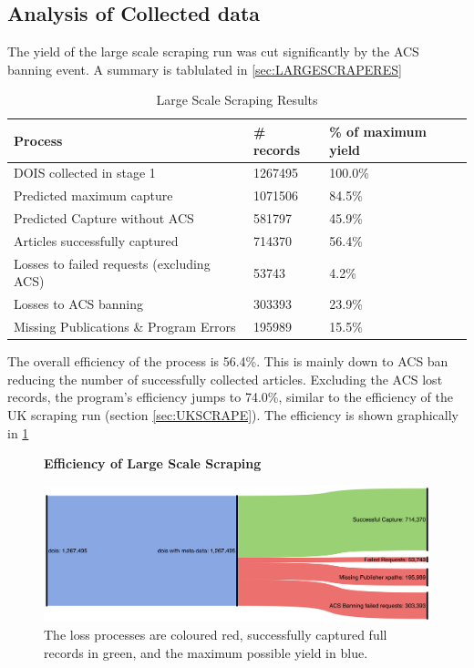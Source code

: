\subsection{Analysis of Collected data}
The yield of the large scale scraping run was cut significantly by the ACS banning event. A summary is tablulated in \ref{sec:LARGESCRAPERES}
\begin{table}[h!]
\label{tab:LARGESCRAPERES}
\caption{Large Scale Scraping Results}
\begin{center}
\begin{tabular}{||l|l|l||}
\hline
Process & \# records & \% of maximum yield\\
\hline
DOIS collected in stage 1 &  1267495 &100.0\%\\
\hline
Predicted maximum capture & 1071506 &  84.5\%\\
Predicted Capture without ACS & 581797 & 45.9\%\\
\hline
Articles successfully captured & 714370 & 56.4\%\\
Losses to failed requests (excluding ACS)& 53743 & 4.2\%\\
Losses to ACS banning & 303393 & 23.9\%\\
Missing Publications \& Program Errors & 195989 & 15.5\%\\
\hline
\end{tabular}
\end{center}
\end{table}
The overall efficiency of the process is 56.4\%. This is mainly down to ACS ban reducing the number of successfully collected articles. Excluding the ACS lost records, the program's efficiency jumps to 74.0\%, similar to the efficiency of the UK scraping run (section \ref{sec:UKSCRAPE}).  The efficiency is shown graphically in \ref{fig:LARGESANK}
\begin{figure}[H]
    \centering
    \textbf{Efficiency of Large Scale Scraping}\par\medskip
    \includegraphics[scale=0.07]{Data_Acquisition/large_sankey.png}
    \caption{The loss processes are coloured red, successfully captured full records in green, and the maximum possible yield in blue.}
     \label{fig:LARGESANK}
\end{figure}

